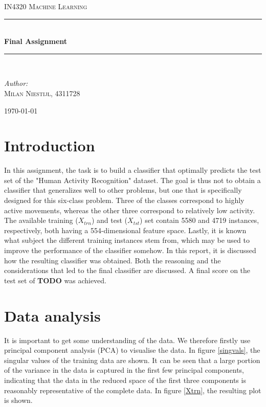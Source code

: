 \documentclass [a4paper] {report}
\begin{document}
	
	\begin{titlepage}
		\begin{center}
			
			\textsc{\LARGE IN4320 Machine Learning}\\[1.25cm]
			
			\rule{\linewidth}{0.5mm}\\[1.0cm]
			{\huge \bfseries Final Assignment }\\[0.6cm]
			\rule{\linewidth}{0.5mm}\\[1.5cm]
			
			\begin{minipage}{0.4\textwidth}
				\begin{flushleft} \large	
					\emph{Author:}\\
					\textsc{Milan Niestijl, 4311728}
				\end{flushleft}
			\end{minipage}
			
			\vfill
			{\large \today}
		\end{center}
	\end{titlepage}
	
	\section*{Introduction}
	In this assignment, the task is to build a classifier that optimally predicts the test set of the "Human Activity Recognition" dataset. The goal is thus not to obtain a classifier that generalizes well to other problems, but one that is specifically designed for this six-class problem. Three of the classes correspond to highly active movements, whereas the other three correspond to relatively low activity. The available training ($X_{trn}$) and test ($X_{tst}$) set contain 5580 and 4719 instances, respectively, both having a 554-dimensional feature space. Lastly, it is known what subject the different training instances stem from, which may be used to improve the performance of the classifier somehow. In this report, it is discussed how the resulting classifier was obtained. Both the reasoning and the considerations that led to the final classifier are discussed. A final score on the test set of \textbf{TODO} was achieved.\\
	

	\section*{Data analysis}
	It is important to get some understanding of the data. We therefore firstly use principal component analysis (PCA) to visualise the data. In figure \ref{singvals}, the singular values of the training data are shown. It can be seen that a large portion of the variance in the data is captured in the first few principal components, indicating that the data in the reduced space of the first three components is reasonably representative of the complete data. In figure \ref{Xtrn}, the resulting plot is shown. 
	
\end{document}
